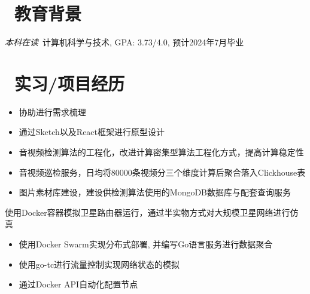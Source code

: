 \documentclass{resume}
\begin{document}


\section{\faGraduationCap\  教育背景}
\textit{本科在读}\ 计算机科学与技术, GPA: 3.73/4.0, 预计2024年7月毕业


\section{\faUsers\ 实习/项目经历}
\role{实习}{金融科技实习生}
\begin{itemize}
  \item 协助进行需求梳理
  \item 通过Sketch以及React框架进行原型设计
\end{itemize}

\begin{itemize}
  \item 音视频检测算法的工程化，改进计算密集型算法工程化方式，提高计算稳定性
  \item 音视频巡检服务，日均将80000条视频分三个维度计算后聚合落入Clickhouse表
  \item 图片素材库建设，建设供检测算法使用的MongoDB数据库与配套查询服务
\end{itemize}

\begin{onehalfspacing}
使用Docker容器模拟卫星路由器运行，通过半实物方式对大规模卫星网络进行仿真
\begin{itemize}
  \item 使用Docker Swarm实现分布式部署, 并编写Go语言服务进行数据聚合
  \item 使用go-tc进行流量控制实现网络状态的模拟
  \item 通过Docker API自动化配置节点
\end{itemize}
\end{onehalfspacing}
\end{document}
